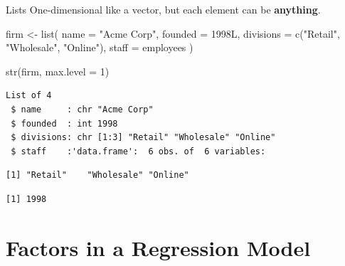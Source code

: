 \documentclass[
  ignorenonframetext,
  aspectratio=169,
]{beamer}
\newenvironment{Shaded}{\begin{snugshade}}{\end{snugshade}}
\newcommand{\AttributeTok}[1]{\textcolor[rgb]{0.40,0.45,0.13}{#1}}
\newcommand{\DecValTok}[1]{\textcolor[rgb]{0.68,0.00,0.00}{#1}}
\newcommand{\FunctionTok}[1]{\textcolor[rgb]{0.28,0.35,0.67}{#1}}
\newcommand{\NormalTok}[1]{\textcolor[rgb]{0.00,0.23,0.31}{#1}}
\newcommand{\OtherTok}[1]{\textcolor[rgb]{0.00,0.23,0.31}{#1}}
\newcommand{\SpecialCharTok}[1]{\textcolor[rgb]{0.37,0.37,0.37}{#1}}
\newcommand{\StringTok}[1]{\textcolor[rgb]{0.13,0.47,0.30}{#1}}
\begin{document}
\begin{frame}[fragile]{Lists}
\protect\hypertarget{lists}{}
One-dimensional like a vector, but each element can be
\textbf{anything}.

\begin{Shaded}
\begin{Highlighting}[]
\NormalTok{firm }\OtherTok{\textless{}{-}} \FunctionTok{list}\NormalTok{(}
  \AttributeTok{name      =} \StringTok{"Acme Corp"}\NormalTok{,}
  \AttributeTok{founded   =}\NormalTok{ 1998L,}
  \AttributeTok{divisions =} \FunctionTok{c}\NormalTok{(}\StringTok{"Retail"}\NormalTok{, }\StringTok{"Wholesale"}\NormalTok{, }\StringTok{"Online"}\NormalTok{),}
  \AttributeTok{staff     =}\NormalTok{ employees}
\NormalTok{)}

\FunctionTok{str}\NormalTok{(firm, }\AttributeTok{max.level =} \DecValTok{1}\NormalTok{)}
\end{Highlighting}
\end{Shaded}

\begin{verbatim}
List of 4
 $ name     : chr "Acme Corp"
 $ founded  : int 1998
 $ divisions: chr [1:3] "Retail" "Wholesale" "Online"
 $ staff    :'data.frame':  6 obs. of  6 variables:
\end{verbatim}

\begin{Shaded}
\end{Shaded}

\begin{verbatim}
[1] "Retail"    "Wholesale" "Online"   
\end{verbatim}

\begin{verbatim}
[1] 1998
\end{verbatim}
\end{frame}

\hypertarget{sec-lm}{%
\section{Factors in a Regression Model}\label{sec-lm}}
\end{document}
